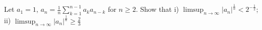 Let $a_{1}=1$, $a_{n}=\frac{1}{n} \sum_{k=1}^{n-1}a_{k}a_{n-k}$ for $n\geq 2$. Show that
i) $\limsup_{n\to \infty} |a_{n}|^{\frac{1}{n}}<2^{-\frac{1}{2}}$;
ii) $\limsup_{n\to \infty} |a_{n}|^{\frac{1}{n}}\geq \frac{2}{3}$